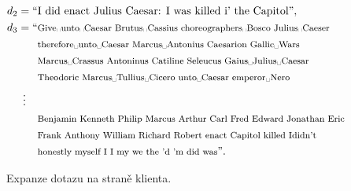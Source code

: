 \documentclass[aspectratio=169,t]{beamer}
\begin{document}
\begin{frame}[c]
\begin{figure}
\vfill
\begin{align*}
  d_2 = \text{``}&\text{I did enact Julius Caesar: I was killed i' the Capitol''}, \\
  d_3 = \text{``}&\text{\footnotesize Give\textvisiblespace{}unto\textvisiblespace{}Caesar Brutus\textvisiblespace{}Cassius choreographers\textvisiblespace{}Bosco Julius\textvisiblespace{}Caeser}\index{.d3@$d_3$|emph} \\
  &\text{\footnotesize therefore\textvisiblespace{}unto\textvisiblespace{}Caesar Marcus\textvisiblespace{}Antonius Caesarion
    Gallic\textvisiblespace{}Wars} \\
  &\text{\footnotesize Marcus\textvisiblespace{}Crassus Antoninus Catiline Seleucus
    Gaius\textvisiblespace{}Julius\textvisiblespace{}Caesar} \\
  &\text{\footnotesize Theodoric Marcus\textvisiblespace{}Tullius\textvisiblespace{}Cicero unto\textvisiblespace{}Caesar
    emperor\textvisiblespace{}Nero} \\
  \vdots \phantom{{}=} & \\
  &\text{\footnotesize Benjamin Kenneth Philip Marcus Arthur Carl Fred Edward Jonathan Eric} \\
  &\text{\footnotesize Frank Anthony William Richard Robert enact Capitol killed Ididn't} \\
  &\text{\begingroup\footnotesize honestly myself I I my we the
    'd 'm did was\endgroup''}.
\end{align*}
\caption{Expanze dotazu na straně klienta.}
\end{figure}
\end{frame}

\end{document}
